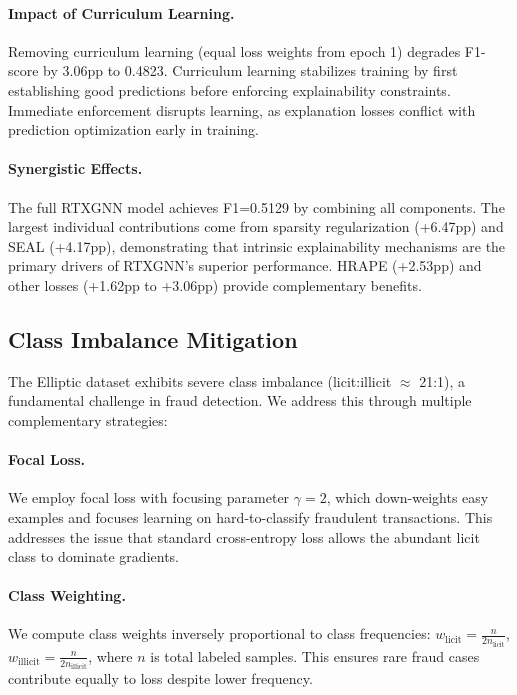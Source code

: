 \paragraph{Impact of Curriculum Learning.} Removing curriculum learning (equal loss weights from epoch 1) degrades F1-score by 3.06pp to 0.4823. Curriculum learning stabilizes training by first establishing good predictions before enforcing explainability constraints. Immediate enforcement disrupts learning, as explanation losses conflict with prediction optimization early in training.

\paragraph{Synergistic Effects.} The full RTXGNN model achieves F1=0.5129 by combining all components. The largest individual contributions come from sparsity regularization (+6.47pp) and SEAL (+4.17pp), demonstrating that intrinsic explainability mechanisms are the primary drivers of RTXGNN's superior performance. HRAPE (+2.53pp) and other losses (+1.62pp to +3.06pp) provide complementary benefits.

\subsection{Class Imbalance Mitigation}
\label{subsec:class_imbalance}

The Elliptic dataset exhibits severe class imbalance (licit:illicit $\approx$ 21:1), a fundamental challenge in fraud detection. We address this through multiple complementary strategies:

\paragraph{Focal Loss.} We employ focal loss \citep{lin2017focal} with focusing parameter $\gamma=2$, which down-weights easy examples and focuses learning on hard-to-classify fraudulent transactions. This addresses the issue that standard cross-entropy loss allows the abundant licit class to dominate gradients.

\paragraph{Class Weighting.} We compute class weights inversely proportional to class frequencies: $w_{\text{licit}} = \frac{n}{2n_{\text{licit}}}$, $w_{\text{illicit}} = \frac{n}{2n_{\text{illicit}}}$, where $n$ is total labeled samples. This ensures rare fraud cases contribute equally to loss despite lower frequency.


